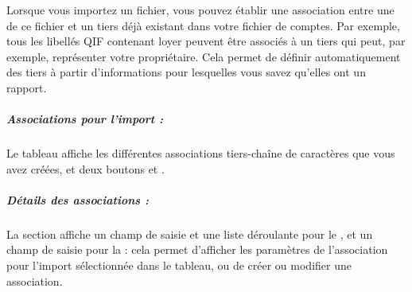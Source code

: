 \ifIllustration
\pichskip{8mm}
\label{setup-importLinks-img}
\fi
\noindent Lorsque vous importez un fichier, vous pouvez établir une association entre une  de ce fichier et un tiers déjà existant dans votre fichier de comptes. Par exemple, tous les libellés \gls{QIF} contenant \og loyer \fg{} peuvent être associés à un tiers qui peut, par exemple, représenter votre propriétaire. Cela permet de définir automatiquement des tiers à partir d'informations pour lesquelles vous savez qu'elles ont un rapport.


\ifIllustration
\fi

\subparagraph{Associations pour l'import :\label{setup-general-importlinks-array}}

Le tableau affiche les différentes associations tiers-chaîne de caractères que vous avez créées, et deux boutons  et . 


\subparagraph{Détails des associations :\label{setup-general-importlinks-details}}
La section  affiche un champ de saisie et une liste déroulante pour le , et un champ de saisie pour la  : cela permet d'afficher les paramètres de l'association pour l'import sélectionnée dans le tableau, ou de créer ou modifier une association.

